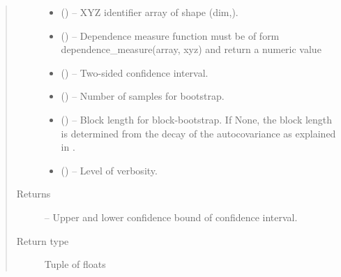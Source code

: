 \documentclass[letterpaper,10pt,english]{sphinxmanual}
\begin{document}
\begin{fulllineitems}
\begin{fulllineitems}
\begin{quote}
\begin{description}
\begin{itemize}
\item {} 
 () -- XYZ identifier array of shape (dim,).

\item {} 
 () -- Dependence measure function must be of form
dependence\_measure(array, xyz) and return a numeric value

\item {} 
 (\sphinxstyleliteralemphasis{, }\sphinxstyleliteralemphasis{ (}\sphinxstyleliteralemphasis{)}\sphinxstyleliteralemphasis{}) -- Two-sided confidence interval.

\item {} 
 (\sphinxstyleliteralemphasis{, }\sphinxstyleliteralemphasis{ (}\sphinxstyleliteralemphasis{)}\sphinxstyleliteralemphasis{}) -- Number of samples for bootstrap.

\item {} 
 (\sphinxstyleliteralemphasis{, }\sphinxstyleliteralemphasis{ (}\sphinxstyleliteralemphasis{)}\sphinxstyleliteralemphasis{}) -- Block length for block-bootstrap. If None, the block length is
determined from the decay of the autocovariance as explained in
\sphinxfootnotemark[1].

\item {} 
 (\sphinxstyleliteralemphasis{, }\sphinxstyleliteralemphasis{ (}\sphinxstyleliteralemphasis{)}\sphinxstyleliteralemphasis{}) -- Level of verbosity.

\end{itemize}

\item[{Returns}] \leavevmode
{} -- Upper and lower confidence bound of confidence interval.

\item[{Return type}] \leavevmode
Tuple of floats


\end{description}
\end{quote}
\end{fulllineitems}
\end{fulllineitems}
\end{document}
